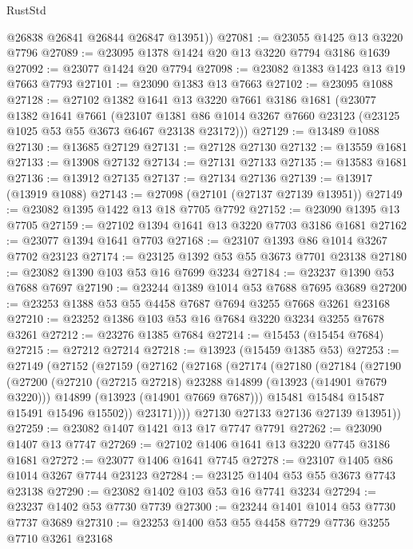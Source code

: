 \begin{lexlean}{RustStd}
\begin{coremodule}
        @26838
        @26841
        @26844
        @26847
        @13951))
@27081 := @23055 @1425 @13 @3220 @7796
@27089 := @23095 @1378 @1424 @20 @13 @3220 @7794 @3186 @1639
@27092 := @23077 @1424 @20 @7794
@27098 := @23082 @1383 @1423 @13 @19 @7663 @7793
@27101 := @23090 @1383 @13 @7663
@27102 := @23095 @1088
@27128 := @27102
    @1382
    @1641
    @13
    @3220
    @7661
    @3186
    @1681
    (@23077
      @1382
      @1641
      @7661
      (@23107 @1381 @86 @1014 @3267 @7660 @23123 (@23125 @1025 @53 @55 @3673 @6467 @23138 @23172)))
@27129 := @13489 @1088
@27130 := @13685 @27129
@27131 := @27128 @27130
@27132 := @13559 @1681
@27133 := @13908 @27132
@27134 := @27131 @27133
@27135 := @13583 @1681
@27136 := @13912 @27135
@27137 := @27134 @27136
@27139 := @13917 (@13919 @1088)
@27143 := @27098 (@27101 (@27137 @27139 @13951))
@27149 := @23082 @1395 @1422 @13 @18 @7705 @7792
@27152 := @23090 @1395 @13 @7705
@27159 := @27102 @1394 @1641 @13 @3220 @7703 @3186 @1681
@27162 := @23077 @1394 @1641 @7703
@27168 := @23107 @1393 @86 @1014 @3267 @7702 @23123
@27174 := @23125 @1392 @53 @55 @3673 @7701 @23138
@27180 := @23082 @1390 @103 @53 @16 @7699 @3234
@27184 := @23237 @1390 @53 @7688 @7697
@27190 := @23244 @1389 @1014 @53 @7688 @7695 @3689
@27200 := @23253 @1388 @53 @55 @4458 @7687 @7694 @3255 @7668 @3261 @23168
@27210 := @23252 @1386 @103 @53 @16 @7684 @3220 @3234 @3255 @7678 @3261
@27212 := @23276 @1385 @7684
@27214 := @15453 (@15454 @7684)
@27215 := @27212 @27214
@27218 := @13923 (@15459 @1385 @53)
@27253 := @27149
    (@27152
      (@27159
        (@27162
          (@27168
            (@27174
              (@27180
                (@27184
                  (@27190
                    (@27200
                      (@27210 (@27215 @27218) @23288 @14899 (@13923 (@14901 @7679 @3220)))
                      @14899
                      (@13923 (@14901 @7669 @7687)))
                    @15481
                    @15484
                    @15487
                    @15491
                    @15496
                    @15502))
                @23171))))
        @27130
        @27133
        @27136
        @27139
        @13951))
@27259 := @23082 @1407 @1421 @13 @17 @7747 @7791
@27262 := @23090 @1407 @13 @7747
@27269 := @27102 @1406 @1641 @13 @3220 @7745 @3186 @1681
@27272 := @23077 @1406 @1641 @7745
@27278 := @23107 @1405 @86 @1014 @3267 @7744 @23123
@27284 := @23125 @1404 @53 @55 @3673 @7743 @23138
@27290 := @23082 @1402 @103 @53 @16 @7741 @3234
@27294 := @23237 @1402 @53 @7730 @7739
@27300 := @23244 @1401 @1014 @53 @7730 @7737 @3689
@27310 := @23253 @1400 @53 @55 @4458 @7729 @7736 @3255 @7710 @3261 @23168

\end{coremodule}
\end{lexlean}
